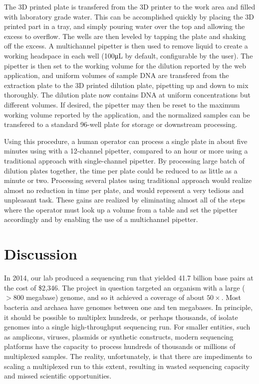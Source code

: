 \begin{refsection}
The 3D printed plate is transfered from the 3D printer to the work area and filled with laboratory grade water. This can be accomplished quickly by placing the 3D printed part in a tray, and simply pouring water over the top and allowing the excess to overflow. The wells are then leveled by tapping the plate and shaking off the excess. A multichannel pipetter is then used to remove liquid to create a working headspace in each well (100\si{\micro\liter} by default, configurable by the user). The pipetter is then set to the working volume for the dilution reported by the web application, and uniform volumes of sample DNA are transfered from the extraction plate to the 3D printed dilution plate, pipetting up and down to mix thoroughly. The dilution plate now contains DNA at uniform concentrations but different volumes. If desired, the pipetter may then be reset to the maximum working volume reported by the application, and the normalized samples can be transfered to a standard 96-well plate for storage or downstream processing.



Using this procedure, a human operator can process a single plate in about five minutes using with a 12-channel pipetter, compared to an hour or more using a traditional approach with single-channel pipetter. By processing large batch of dilution plates together, the time per plate could be reduced to as little as a minute or two. Processing several plates using traditional approach would realize almost no reduction in time per plate, and would represent a very tedious and unpleasant task. These gains are realized by eliminating almost all of the steps where the operator must look up a volume from a table and set the pipetter accordingly and by enabling the use of a multichannel pipetter.

\section{Discussion}

In 2014, our lab produced a sequencing run that yielded 41.7 billion base pairs at the cost of \$2,346. The project in question targeted an organism with a large ($>800$ megabase) genome, and so it achieved a coverage of about $50\times$. Most bacteria and archaea have genomes between one and ten megabases. In principle, it should be possible to multiplex hundreds, or perhaps thousands, of isolate genomes into a single high-throughput sequencing run. For smaller entities, such as amplicons, viruses, plasmids or synthetic constructs, modern sequencing platforms have the capacity to process hundreds of thousands or millions of multiplexed samples. The reality, unfortunately, is that there are impediments to scaling a multiplexed run to this extent, resulting in wasted sequencing capacity and missed scientific opportunities.


\end{refsection}
